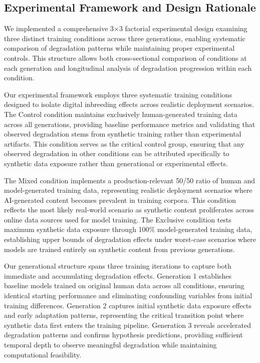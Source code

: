 \documentclass{article}
\begin{document}
\subsection{Experimental Framework and Design Rationale}

We implemented a comprehensive 3×3 factorial experimental design examining three distinct training conditions across three generations, enabling systematic comparison of degradation patterns while maintaining proper experimental controls. This structure allows both cross-sectional comparison of conditions at each generation and longitudinal analysis of degradation progression within each condition.

Our experimental framework employs three systematic training conditions designed to isolate digital inbreeding effects across realistic deployment scenarios. The Control condition maintains exclusively human-generated training data across all generations, providing baseline performance metrics and validating that observed degradation stems from synthetic training rather than experimental artifacts. This condition serves as the critical control group, ensuring that any observed degradation in other conditions can be attributed specifically to synthetic data exposure rather than generational or experimental effects.

The Mixed condition implements a production-relevant 50/50 ratio of human and model-generated training data, representing realistic deployment scenarios where AI-generated content becomes prevalent in training corpora. This condition reflects the most likely real-world scenario as synthetic content proliferates across online data sources used for model training. The Exclusive condition tests maximum synthetic data exposure through 100\% model-generated training data, establishing upper bounds of degradation effects under worst-case scenarios where models are trained entirely on synthetic content from previous generations.

Our generational structure spans three training iterations to capture both immediate and accumulating degradation effects. Generation 1 establishes baseline models trained on original human data across all conditions, ensuring identical starting performance and eliminating confounding variables from initial training differences. Generation 2 captures initial synthetic data exposure effects and early adaptation patterns, representing the critical transition point where synthetic data first enters the training pipeline. Generation 3 reveals accelerated degradation patterns and confirms hypothesis predictions, providing sufficient temporal depth to observe meaningful degradation while maintaining computational feasibility.
\end{document}
